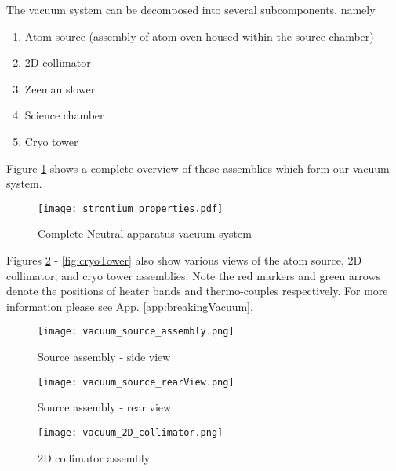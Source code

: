 \noindent The vacuum system can be decomposed into several subcomponents, namely
\begin{enumerate}
\item Atom source (assembly of atom oven housed within the source chamber)
\item 2D collimator
\item Zeeman slower
\item Science chamber
\item Cryo tower
\end{enumerate}
Figure \ref{fig:vacuumSystem} shows a complete overview of these assemblies which form our vacuum system.
	\begin{figure} 
		\centerline{
		\texttt{[image: strontium\_properties.pdf]}}
		\caption{Complete Neutral apparatus vacuum system}
		\label{fig:vacuumSystem}
	\end{figure}
Figures \ref{fig:sourceSideView} - \ref{fig:cryoTower} also show various views of the atom source, 2D collimator, and cryo tower assemblies. Note the red markers and green arrows denote the positions of heater bands and thermo-couples respectively. For more information please see App. \ref{app:breakingVacuum}.
	\begin{figure} 
		\centerline{
		\texttt{[image: vacuum\_source\_assembly.png]}}
		\caption{Source assembly - side view}
		\label{fig:sourceSideView}
	\end{figure}
	
	\begin{figure} 
		\centerline{
		\texttt{[image: vacuum\_source\_rearView.png]}}
		\caption{Source assembly - rear view}
		\label{fig:sourceRearView}
	\end{figure}
	
	\begin{figure} 
		\centerline{
		\texttt{[image: vacuum\_2D\_collimator.png]}}
		\caption{2D collimator assembly}
		\label{fig:assembly_2Dcoll}
	\end{figure}
	
